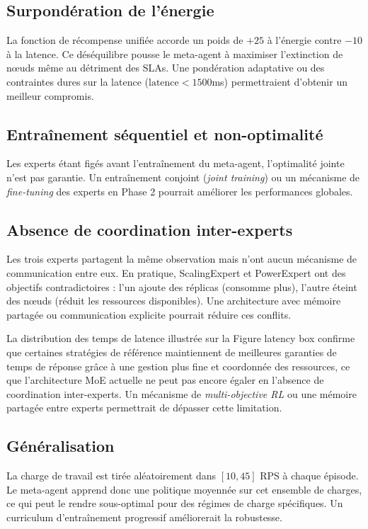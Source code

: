 \subsection{Surpondération de l'énergie}

La fonction de récompense unifiée accorde un poids de $+25$ à l'énergie
contre $-10$ à la latence. Ce déséquilibre pousse le meta-agent à maximiser
l'extinction de nœuds même au détriment des SLAs. Une pondération
adaptative ou des contraintes dures sur la latence ($\text{latence} < 1500$ms)
permettraient d'obtenir un meilleur compromis.

\subsection{Entraînement séquentiel et non-optimalité}

Les experts étant figés avant l'entraînement du meta-agent, l'optimalité
jointe n'est pas garantie. Un entraînement conjoint (\textit{joint
training}) ou un mécanisme de \textit{fine-tuning} des experts en Phase 2
pourrait améliorer les performances globales.

\subsection{Absence de coordination inter-experts}

Les trois experts partagent la même observation mais n'ont aucun mécanisme
de communication entre eux. En pratique, ScalingExpert et PowerExpert ont
des objectifs contradictoires : l'un ajoute des réplicas (consomme plus),
l'autre éteint des nœuds (réduit les ressources disponibles). Une
architecture avec mémoire partagée ou communication explicite pourrait
réduire ces conflits.

La distribution des temps de latence illustrée sur la
Figure latency box confirme que certaines stratégies de référence
maintiennent de meilleures garanties de temps de réponse grâce à une gestion
plus fine et coordonnée des ressources, ce que l'architecture MoE actuelle
ne peut pas encore égaler en l'absence de coordination inter-experts.
Un mécanisme de \textit{multi-objective RL} ou une mémoire partagée entre
experts permettrait de dépasser cette limitation.


\subsection{Généralisation}

La charge de travail est tirée aléatoirement dans $[10, 45]$ RPS à chaque
épisode. Le meta-agent apprend donc une politique moyennée sur cet
ensemble de charges, ce qui peut le rendre sous-optimal pour des régimes
de charge spécifiques. Un curriculum d'entraînement progressif améliorerait
la robustesse.
